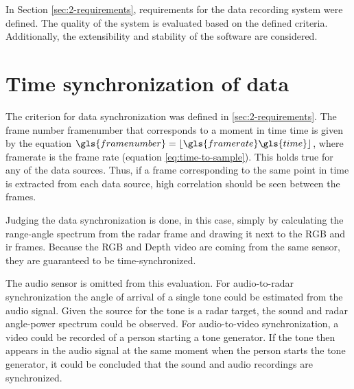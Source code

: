 In Section \ref{sec:2-requirements}, requirements for the data recording system were defined.
The quality of the system is evaluated based on the defined criteria.
Additionally, the extensibility and stability of the software are considered.

\section{Time synchronization of data}
The criterion for data synchronization was defined in \ref{sec:2-requirements}.
The frame number \gls{framenumber} that corresponds to a moment in time \gls{time} is given by the equation $\gls{framenumber} = \lfloor \gls{framerate} \gls{time} \rfloor$,
where \gls{framerate} is the frame rate (equation \ref{eq:time-to-sample}).
This holds true for any of the data sources.
Thus, if a frame corresponding to the same point in time is extracted from each data source,
high correlation should be seen between the frames.

Judging the data synchronization is done, in this case,
simply by calculating the range-angle spectrum from the radar frame and drawing it next to the RGB and \gls{ir} frames.
Because the RGB and Depth video are coming from the same sensor, they are guaranteed to be time-synchronized.

The audio sensor is omitted from this evaluation.
For audio-to-radar synchronization the angle of arrival of a single tone could be estimated from the audio signal.
Given the source for the tone is a radar target, the sound and radar angle-power spectrum could be observed.
For audio-to-video synchronization, a video could be recorded of a person starting a tone generator.
If the tone then appears in the audio signal at the same moment when the person starts the tone generator,
it could be concluded that the sound and audio recordings are synchronized.

